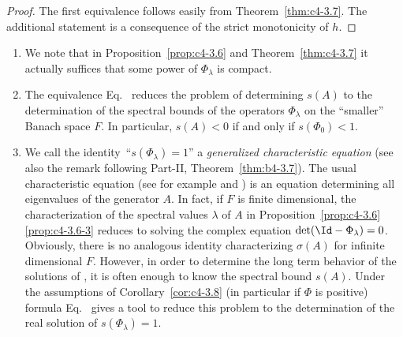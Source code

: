 \begin{proof}
The first equivalence follows easily from Theorem~\ref{thm:c4-3.7}. 
The additional statement is a consequence of the strict monotonicity of\/ $h$.
\end{proof}
\begin{remarks*}\label{rem:c4-3.0-kgk}
%
\begin{enumerate}[\upshape (i), wide, labelindent=.25em] 
\item \label{rem:c4-3.1-1}
We note that in Proposition~\ref{prop:c4-3.6} and Theorem~\ref{thm:c4-3.7} it actually suffices that some power of\/ $\Phi_{\lambda}$ is compact.

\item \label{rem:c4-3.1-2}
The equivalence Eq.~ reduces the problem of determining $s(A)$ to the determination of the spectral bounds of the operators $\Phi_{\lambda}$ on the \enquote{smaller} Banach space $F$.
In particular, $s(A) < 0$ if and only if\/ $s(\Phi_{0}) < 1$.

\item \label{rem:c4-3.1-3}
We call the identity\, \enquote{$s(\Phi_{\lambda}) = 1$} a \emph{generalized characteristic equation} (see also the remark following Part-II, Theorem~\ref{thm:b4-3.7}). The usual characteristic equation (see for example  \textcite[p.168ff]{hale:1977} and \textcite[Section~5]{heijmans:1985b})
is an equation determining all eigenvalues of the generator $A$. 
In fact, if\/ $F$ is finite dimensional, the characterization of the spectral values $\lambda$ of\/ $A$ in Proposition~\ref{prop:c4-3.6}\,\ref{prop:c4-3.6-3} reduces to solving the complex equation $\det(\Id - \Phi_{\lambda}) = 0$. 
Obviously, there is no analogous identity characterizing $\sigma(A)$ for infinite dimensional $F$. 
However, in order to determine the long term behavior of the solutions of , it is often enough to know the spectral bound $s(A)$. 
Under the assumptions of Corollary~\ref{cor:c4-3.8} (in particular if\/ $\Phi$ is positive) formula Eq.~ gives a tool to reduce this problem to the determination of the real solution of\/ $s(\Phi_{\lambda}) = 1$.
\end{enumerate}
\end{remarks*}
